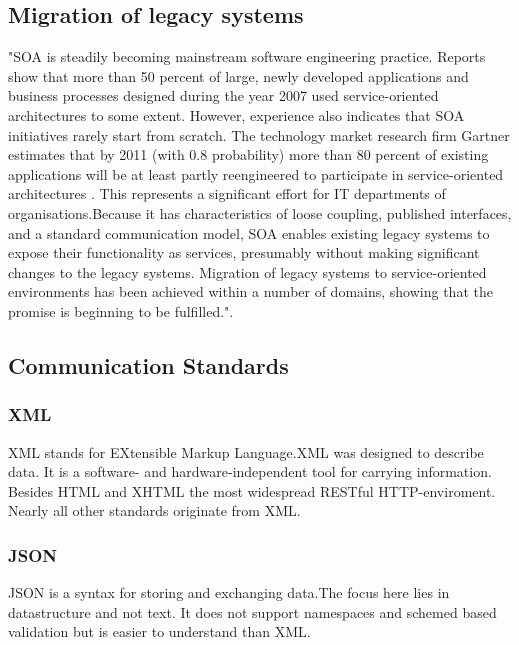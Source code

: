 \documentclass[12pt]{article}
\begin{document}
\subsection{Migration of legacy systems}
"SOA is steadily becoming mainstream software engineering practice. Reports show that more than 50 percent of large, newly developed applications and business processes designed during the year 2007 used service-oriented architectures to some extent. However, experience also indicates that SOA initiatives rarely start from scratch. The technology market research firm Gartner estimates that by 2011 (with 0.8 probability) more than 80 percent of existing applications will be at least partly reengineered to participate in service-oriented architectures . This represents a significant effort for IT departments of organisations.Because it has characteristics of loose coupling, published interfaces, and a standard communication model, SOA enables existing legacy systems to expose their functionality as services, presumably without making significant changes to the legacy systems. Migration of legacy systems to service-oriented environments has been achieved within a number of domains, showing that the promise is beginning to be fulfilled."\cite{legacy}.
\\
\subsection{Communication Standards}

\subsubsection{XML}
XML stands for EXtensible Markup Language.XML was designed to describe data.
It is a software- and hardware-independent tool for carrying information.\\
Besides HTML and XHTML the most widespread RESTful HTTP-enviroment.\\
Nearly all other standards originate from XML.
\subsubsection{JSON}
JSON is a syntax for storing and exchanging data.The focus here lies in datastructure and not text.
It does not support namespaces and schemed based validation but is easier to understand than XML.
\end{document}

